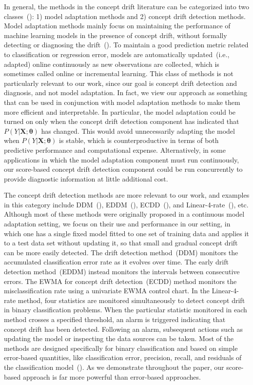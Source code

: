 \documentclass[twoside,11pt]{article}
\begin{document}
In general, the methods in the concept drift literature can be categorized into two classes~(\cite{tsymbal2004problem}): 1) model adaptation methods and 2) concept drift detection methods. Model adaptation methods mainly focus on maintaining the performance of machine learning models in the presence of concept drift, without formally detecting or diagnosing the drift~(\cite{wang2003mining,tsymbal2008dynamic,gonccalves2014comparative,barros2018large}). To maintain a good prediction metric related to classification or regression error, models are automatically updated~(i.e., adapted) online continuously as new observations are collected, which is sometimes called online or incremental learning. This class of methods is not particularly relevant to our work, since our goal is concept drift detection and diagnosis, and not model adaptation. In fact, we view our approach as something that can be used in conjunction with model adaptation methods to make them more efficient and interpretable. In particular, the model adaptation could be turned on only when the concept drift detection component has indicated that $P(Y|\bm{X};\bm{\theta})$ has changed. This would avoid unnecessarily adapting the model when $P(Y|\bm{X}; \bm{\theta})$ is stable, which is counterproductive in terms of both predictive performance and computational expense. Alternatively, in some applications in which the model adaptation component must run continuously, our score-based concept drift detection component could be run concurrently to provide diagnostic information at little additional cost.

The concept drift detection methods are more relevant to our work, and examples in this category include DDM~(\cite{gama2004learning}), EDDM~(\cite{baena2006early}), ECDD~(\cite{ross2012exponentially}), and Linear-4-rate~(\cite{wang2015concept}), etc. Although most of these methods were originally proposed in a continuous model adaptation setting, we focus on their use and performance in our setting, in which one has a single fixed model fitted to one set of training data and applies it to a test data set without updating it, so that small and gradual concept drift can be more easily detected. The drift detection method~(DDM) monitors the accumulated classification error rate as it evolves over time. The early drift detection method~(EDDM) instead monitors the intervals between consecutive errors. The EWMA for concept drift detection~(ECDD) method monitors the misclassification rate using a univariate EWMA control chart. In the Linear-4-rate method, four statistics are monitored simultaneously to detect concept drift in binary classification problems. When the particular statistic monitored in each method crosses a specified threshold, an alarm is triggered indicating that concept drift has been detected. Following an alarm, subsequent actions such as updating the model or inspecting the data sources can be taken. Most of the methods are designed specifically for binary classification and based on simple error-based quantities, like classification error, precision, recall, and residuals of the classification model~(\cite{wang2015concept,barros2018large}). As we demonstrate throughout the paper, our score-based approach is far more powerful than error-based approaches.
\end{document}
